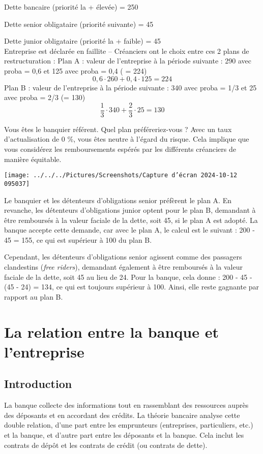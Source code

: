 \documentclass[a4paper, 12pt]{report}
\begin{document}
Dette bancaire (priorité la + élevée) = 250

Dette senior obligataire (priorité suivante) = 45

Dette junior obligataire (priorité la + faible) = 45\\
Entreprise est déclarée en faillite – Créanciers ont le choix entre ces 2 plans de restructuration :
Plan A : valeur de l’entreprise à la période suivante : 290 avec proba = 0,6 et 125 avec proba = 0,4 ( = 224)
$$
0,6 \cdot 260 +0,4\cdot125=224
$$
Plan B : valeur de l’entreprise à la période suivante : 340 avec proba = 1/3 et 25 avec proba = 2/3 (= 130)
$$
\frac{1}{3}\cdot 340 +\frac{2}{3}\cdot25=130
$$

Vous êtes le banquier référent. Quel plan préféreriez-vous ? Avec un taux d’actualisation de 0 \%, vous êtes neutre à l’égard du risque. Cela implique que vous considérez les remboursements espérés par les différents créanciers de manière équitable.
\begin{center}
	\texttt{[image: ../../../Pictures/Screenshots/Capture d'écran 2024-10-12 095037]}
\end{center}

Le banquier et les détenteurs d'obligations senior préfèrent le plan A. En revanche, les détenteurs d'obligations junior optent pour le plan B, demandant à être remboursés à la valeur faciale de la dette, soit 45, si le plan A est adopté. La banque accepte cette demande, car avec le plan A, le calcul est le suivant : 200 - 45 = 155, ce qui est supérieur à 100 du plan B.

Cependant, les détenteurs d'obligations senior agissent comme des passagers clandestins (\textit{free riders}), demandant également à être remboursés à la valeur faciale de la dette, soit 45 au lieu de 24. Pour la banque, cela donne : 200 - 45 - (45 - 24) = 134, ce qui est toujours supérieur à 100. Ainsi, elle reste gagnante par rapport au plan B.

\chapter{La relation entre la banque et l’entreprise}

\section*{Introduction}

La banque collecte des informations tout en rassemblant des ressources auprès des déposants et en accordant des crédits. La théorie bancaire analyse cette double relation, d'une part entre les emprunteurs (entreprises, particuliers, etc.) et la banque, et d'autre part entre les déposants et la banque. Cela inclut les contrats de dépôt et les contrats de crédit (ou contrats de dette).
\end{document}
